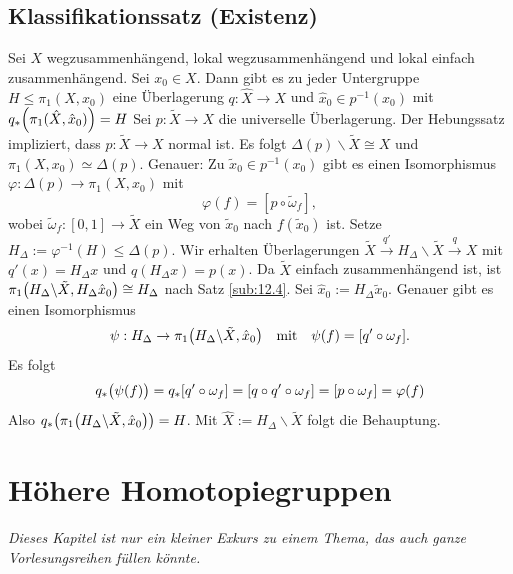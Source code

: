 \subsection{Klassifikationssatz (Existenz)} %
\label{sub:135}
Sei $X$ wegzusammenhängend, lokal wegzusammenhängend und lokal einfach zusammenhängend. Sei $x_0 \in X$. Dann gibt es zu jeder Untergruppe $H \le \pi_1(X,x_0)$ eine
Überlagerung $q : \hat{X} \to X$ und $\hat{x}_0 \in p ^{-1} (x_0)$ mit $q_* \enbrace*{\pi_1(\hat{X}, \hat{x}_0)} = H $
Sei $p : \tilde{X} \to X$ die universelle Überlagerung. Der Hebungssatz impliziert, dass $p : \tilde{X} \to X$ normal 
ist. Es folgt $\Delta(p) \backslash \tilde{X} \cong X$
und $\pi_1(X, x_0) \simeq \Delta(p)$. Genauer: Zu $\tilde{x}_0 \in p ^{-1}(x_0)$ gibt es einen Isomorphismus $\varphi : \Delta (p) \to \pi_1(X,x_0)$ mit 
\[
	\varphi(f) = [p \circ \tilde{\omega}_f],
\]
wobei $\tilde{\omega}_f : [0,1] \to \tilde{X}$ ein Weg von $\tilde{x}_0$ nach $f (\tilde{x}_0)$ ist. Setze $H_\Delta := \varphi ^{-1}(H)  \le \Delta(p)$. Wir erhalten
Überlagerungen $\tilde{X} \xrightarrow{q'} H_\Delta \backslash \tilde{X} \xrightarrow{q} X $ mit $q'(x) = H_\Delta x$ und $q (H_\Delta x) = p(x)$. Da $\tilde{X}$ einfach
zusammenhängend ist, ist $\pi_1 \enbrace*{ H_\Delta \backslash \tilde{X}, H_\Delta \hat{x}_0} \cong H_\Delta$ nach Satz \ref{sub:12.4}. 
Sei $\hat{x}_0 := H_\Delta \tilde{x}_0$.
Genauer gibt es einen Isomorphismus
\[
	\psi : H_\Delta \to \pi_1 \enbrace*{H_\Delta \backslash \tilde{X}, \hat{x}_0} \quad \text{mit} \quad \psi(f) = [q' \circ  \omega_f].
\]
Es folgt 
\[
	q_* \enbrace[\big]{\psi(f)} = q_* [q' \circ \omega_f] = [q \circ q' \circ \omega_f] = [p \circ \omega_f] = \varphi(f) 
\]
Also $q_* \enbrace*{\pi_1 \enbrace*{H_\Delta \backslash \tilde{X}, \hat{x}_0}} = H $. Mit $\hat{X} := H_\Delta \backslash \tilde{X}$ folgt die Behauptung. \bewende
\newpage

\section{Höhere Homotopiegruppen} %
\label{sec:14}
\emph{Dieses Kapitel ist nur ein kleiner Exkurs zu einem Thema, das auch ganze Vorlesungsreihen füllen könnte.}

